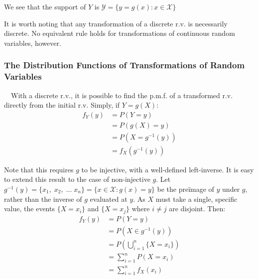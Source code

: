 \documentclass[12pt,a4paper]{article}
\begin{document}
\noindent We see that the support of $Y$ is $\mathcal{Y} = \{y = g(x) : x \in \mathcal{X}\}$\par
\vspace{1cm}
\indent It is worth noting that any transformation of a discrete r.v. is necessarily discrete. No equivalent rule holds for transformations of continuous random variables, however.

\subsubsection{The Distribution Functions of Transformations of Random Variables}

$\quad$With a discrete r.v., it is possible to find the p.m.f. of a transformed r.v. directly from the initial r.v. Simply, if $Y = g(X)$:
\begin{align*}
f_Y(y) &= P(Y = y)\\
&= P(g(X) = y)\\
&= P\left(X = g^{-1}(y)\right)\\
&= f_X(g^{-1}(y))
\end{align*}

Note that this requires $g$ to be injective, with a well-defined left-inverse. It is easy to extend this result to the case of non-injective $g$. Let $g^{-1}(y) = \{x_1, \; x_2, \; ... \; x_n\} = \{x \in \mathcal{X} : g(x) = y\}$ be the pre\"image of $y$ under $g$, rather than the inverse of $g$ evaluated at $y$. As $X$ must take a single, specific value, the events $\{X = x_i\}$ and $\{X = x_j\}$ where $i \neq j$ are disjoint. Then:
\begin{align*}
f_Y(y) &= P(Y = y)\\
&= P\left(X \in g^{-1}(y)\right)\\
&= P\left(\bigcup_{i = 1}^n \{X = x_i\}\right)\\
&= \sum_{i = 1}^n P(X = x_i)\\
& = \sum_{i=1}^n f_X(x_i)
\end{align*}
\end{document}
